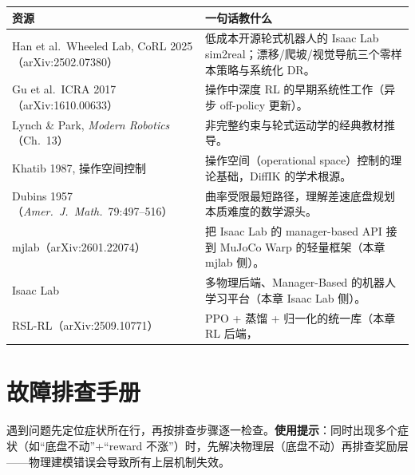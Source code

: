 \begin{center}
\small
\begin{tabular}{@{}p{6.6cm}p{6.4cm}@{}}
\toprule
资源 & 一句话教什么 \\
\midrule
Han et al.\ Wheeled Lab, CoRL 2025（arXiv:2502.07380）\,\cite{han2025wheeledlab} & 低成本开源轮式机器人的 Isaac Lab sim2real；漂移/爬坡/视觉导航三个零样本策略与系统化 DR。 \\
Gu et al.\ ICRA 2017（arXiv:1610.00633）\,\cite{gu2017deeprl} & 操作中深度 RL 的早期系统性工作（异步 off-policy 更新）。 \\
Lynch \& Park, \textit{Modern Robotics}（Ch.\ 13）\,\cite{lynch2017modern} & 非完整约束与轮式运动学的经典教材推导。 \\
Khatib 1987, 操作空间控制\,\cite{khatib1987operational} & 操作空间（operational space）控制的理论基础，DiffIK 的学术根源。 \\
Dubins 1957（\textit{Amer.\ J.\ Math.}\ 79:497--516）\,\cite{dubins1957curves} & 曲率受限最短路径，理解差速底盘规划本质难度的数学源头。 \\
mjlab（arXiv:2601.22074）\,\cite{mjlab2026} & 把 Isaac Lab 的 manager-based API 接到 MuJoCo Warp 的轻量框架（本章 mjlab 侧）。 \\
Isaac Lab\,\cite{mittal2025isaaclab} & 多物理后端、Manager-Based 的机器人学习平台（本章 Isaac Lab 侧）。 \\
RSL-RL（arXiv:2509.10771）\,\cite{schwarke2025rslrl} & PPO + 蒸馏 + 归一化的统一库（本章 RL 后端，\Verb[breaklines]|EmpiricalNormalization| 出处）。 \\
\bottomrule
\end{tabular}
\end{center}

\section{故障排查手册}
\label{sec:rlmc-wh-troubleshoot}

遇到问题先定位症状所在行，再按排查步骤逐一检查。\textbf{使用提示}：同时出现多个症状（如“底盘不动”+“reward 不涨”）时，先解决物理层（底盘不动）再排查奖励层——物理建模错误会导致所有上层机制失效。

